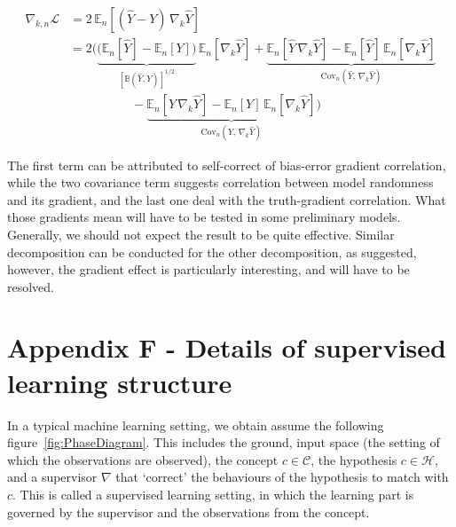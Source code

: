\documentclass[10pt]{article} %
\begin{document}
\begin{align}
    \nabla_{k,n}\mathcal{L}
    &= 2\,\mathbb{E}_n\!\left[(\hat Y - Y)\,\nabla_k \hat Y\right] \\
    &= 2\Bigg(
    \underset{\left[\mathbb{B}(\hat{Y},Y)\right]^{1/2}}{\underbrace{\bigl(\mathbb{E}_n[\hat Y] - \mathbb{E}_n[Y]\bigr)}}\,\mathbb{E}_n[\nabla_k \hat Y]
    + \underset{\mathrm{Cov}_n(\hat Y,\,\nabla_k \hat Y)}{\underbrace{\mathbb{E}_n[\hat Y\,\nabla_k \hat Y] - \mathbb{E}_n[\hat Y]\,\mathbb{E}_n[\nabla_k \hat Y]}}
     \\
    & \quad \quad \quad \quad \quad -\underset{\mathrm{Cov}_n(Y,\,\nabla_k \hat Y)}{\underbrace{\mathbb{E}_n[Y\,\nabla_k \hat Y] - \mathbb{E}_n[Y]\,\mathbb{E}_n[\nabla_k \hat Y]}}
    \Bigg)
\end{align}

The first term can be attributed to self-correct of bias-error gradient correlation, while the two covariance term suggests correlation between model randomness and its gradient, and the last one deal with the truth-gradient correlation. What those gradients mean will have to be tested in some preliminary models. Generally, we should not expect the result to be quite effective. Similar decomposition can be conducted for the other decomposition, as suggested, however, the gradient effect is particularly interesting, and will have to be resolved. 

\section*{Appendix F - Details of supervised learning structure}

In a typical machine learning setting, we obtain assume the following figure~\ref{fig:PhaseDiagram}. This includes the ground, input space (the setting of which the observations are observed), the concept $c\in\mathcal{C}$, the hypothesis $c\in \mathcal{H}$, and a supervisor $\nabla$ that `correct' the behaviours of the hypothesis to match with $c$. This is called a supervised learning setting, in which the learning part is governed by the supervisor and the observations from the concept.
\end{document}
